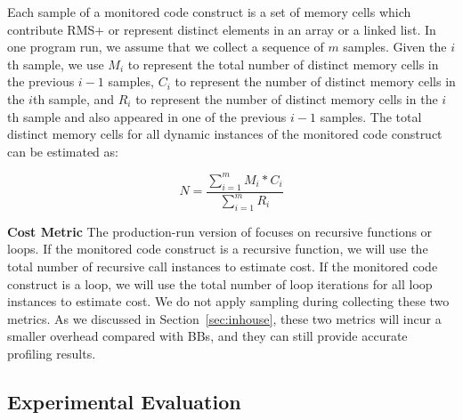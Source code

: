 Each sample of a monitored code construct is a set of memory cells 
which contribute RMS+ or represent distinct elements in an array or a linked list. 
In one program run, we assume that we collect a sequence of $m$ samples. 
Given the $i$th sample, we use $M_i$ to represent the 
total number of distinct memory cells in the previous $i-1$ samples, 
$C_i$ to represent the number of distinct memory cells in the $i$th sample,
and $R_i$ to represent the number of distinct memory cells in 
the $i$th sample and also appeared in one of the previous $i-1$ samples.
The total distinct memory cells for all dynamic instances 
of the monitored code construct can be estimated as:


\begin{equation} \label{eq:mark}
N = \frac{\sum\limits_{i=1}^m M_i*C_i}{\sum\limits_{i=1}^m R_i}
\end{equation}

\noindent\textbf{Cost Metric}
The production-run version of \Tool focuses on recursive functions or loops.
If the monitored code construct is a recursive function,
we will use the total number of recursive call instances to estimate cost.
If the monitored code construct is a loop, 
we will use the total number of loop iterations for all loop instances to estimate cost. 
We do not apply sampling during collecting these two metrics. 
As we discussed in Section~\ref{sec:inhouse},
these two metrics will incur a smaller overhead compared with BBs, 
and they can still provide accurate profiling results.  




\subsection{Experimental Evaluation}


















%
%





